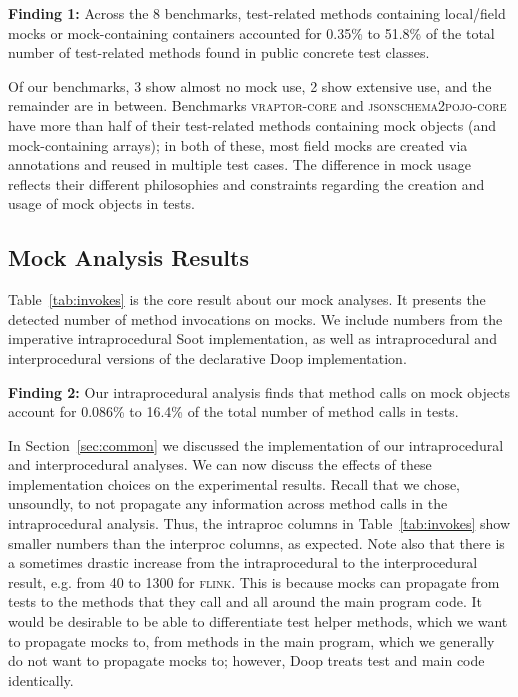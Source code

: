\begin{mdframed}[
	leftmargin=\parindent,
	rightmargin=\parindent,
	skipabove=\topsep,
	skipbelow=\topsep
	]
	{\bf Finding 1:} Across the 8 benchmarks, test-related methods containing local/field mocks or mock-containing containers accounted for 0.35\% to 51.8\% of the total number of test-related methods found in public concrete test classes.
\end{mdframed}

Of our benchmarks, 3 show almost no mock use, 2 show extensive use, and the remainder are in between. Benchmarks \textsc{vraptor-core} and \textsc{jsonschema2pojo-core} have more than half of their test-related methods containing mock objects (and mock-containing arrays); in both of these, most field mocks are created via annotations and reused in multiple test cases. The difference in mock usage reflects their different philosophies and constraints regarding the creation and usage of mock objects in tests.

\subsection{Mock Analysis Results}
Table~\ref{tab:invokes} is the core result about our mock analyses. It presents the detected number of method invocations on mocks. We include numbers from the imperative intraprocedural Soot implementation, as well as intraprocedural and interprocedural versions of the declarative Doop implementation.

\begin{mdframed}[
	leftmargin=\parindent,
	rightmargin=\parindent,
	skipabove=\topsep,
	skipbelow=\topsep
	]
	{\bf Finding 2:} Our intraprocedural analysis finds that method calls on mock objects account for 0.086\% to 16.4\% of the total number of method calls in tests. 
\end{mdframed}


In Section~\ref{sec:common} we discussed the implementation of our intraprocedural and interprocedural analyses. We can now discuss the effects of these implementation choices on the experimental results. Recall that we chose, unsoundly, to not propagate any information across method calls in the intraprocedural analysis. Thus, the intraproc columns in Table~\ref{tab:invokes} show smaller numbers than the interproc columns, as expected. Note also that there is a sometimes drastic increase from the intraprocedural to the interprocedural result, e.g. from 40 to 1300 for \textsc{flink}. This is because mocks can propagate from tests to the methods that they call and all around the main program code. It would be desirable to be able to differentiate test helper methods, which we want to propagate mocks to, from methods in the main program, which we generally do not want to propagate mocks to; however, Doop treats test and main code identically.

